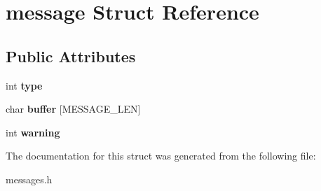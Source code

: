 \hypertarget{structmessage}{}\section{message Struct Reference}
\label{structmessage}
\subsection*{Public Attributes}
\begin{DoxyCompactItemize}
\item 
int {\bfseries type}\hypertarget{structmessage_a629431c0500770c003396e4ba888c2f0}{}\label{structmessage_a629431c0500770c003396e4ba888c2f0}

\item 
char {\bfseries buffer} \mbox{[}M\+E\+S\+S\+A\+G\+E\+\_\+\+L\+EN\mbox{]}\hypertarget{structmessage_adbaca92040e0a01874bb4367e6698f8d}{}\label{structmessage_adbaca92040e0a01874bb4367e6698f8d}

\item 
int {\bfseries warning}\hypertarget{structmessage_a9ae305b36db88c59896fc24cc8198c1a}{}\label{structmessage_a9ae305b36db88c59896fc24cc8198c1a}

\end{DoxyCompactItemize}


The documentation for this struct was generated from the following file\+:\begin{DoxyCompactItemize}
\item 
messages.\+h\end{DoxyCompactItemize}
